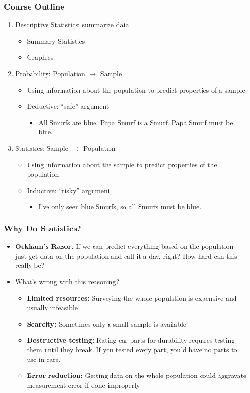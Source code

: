 \documentclass{beamer}
\begin{document}
\begin{frame}
\frametitle{Course Outline}
	\begin{enumerate}
		\item Descriptive Statistics: summarize data
			\begin{itemize}
				\item Summary Statistics
				\item Graphics
			\end{itemize}
		\item Probability: Population $\rightarrow$ Sample
			\begin{itemize}
				\item Using information about the population to predict properties of a sample
				\item Deductive: ``safe'' argument
					\begin{itemize}
						\item All Smurfs are blue. Papa Smurf is a Smurf. Papa Smurf must be blue.
					\end{itemize}
			\end{itemize}
		\item Statistics: Sample $\rightarrow$ Population
			\begin{itemize}
				\item Using information about the sample to predict properties of the population
				\item Inductive: ``risky'' argument
					\begin{itemize}
						\item I've only seen blue Smurfs, so all Smurfs must be blue.
					\end{itemize}
			 \end{itemize}
	\end{enumerate}
\end{frame}

\begin{frame}
\frametitle{Why Do Statistics?}
	\begin{itemize}[<+- | alert@+>]
		\item \textbf{Ockham's Razor:} If we can predict everything based on the population, just 			get data on the population and call it a day, right? How hard can this really be?
		\item What's wrong with this reasoning?
		\begin{itemize}[<+- | alert@+>]
			\item \textbf{Limited resources:} Surveying the whole population is expensive and 					usually infeasible
			\item \textbf{Scarcity:} Sometimes only a small sample is available
			\item \textbf{Destructive testing:} Rating car parts for durability requires testing them 				until they break. If you tested every part, you'd have no parts to use in cars.
			\item \textbf{Error reduction:} Getting data on the whole population could aggravate 				measurement error if done improperly
		\end{itemize}
	\end{itemize}	
\end{frame}
\end{document}
